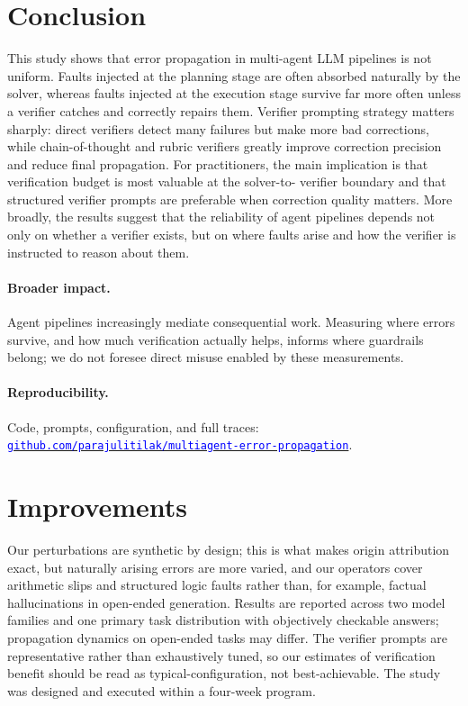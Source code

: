 \documentclass{article}
\begin{document}
\section{Conclusion}
This study shows that error propagation in multi-agent LLM pipelines is not
uniform. Faults injected at the planning stage are often absorbed naturally by
the solver, whereas faults injected at the execution stage survive far more
often unless a verifier catches and correctly repairs them. Verifier prompting
strategy matters sharply: direct verifiers detect many failures but make more
bad corrections, while chain-of-thought and rubric verifiers greatly improve
correction precision and reduce final propagation. For practitioners, the main
implication is that verification budget is most valuable at the solver-to-
verifier boundary and that structured verifier prompts are preferable when
correction quality matters. More broadly, the results suggest that the
reliability of agent pipelines depends not only on whether a verifier exists,
but on where faults arise and how the verifier is instructed to reason about
them.

\paragraph{Broader impact.} Agent pipelines increasingly mediate consequential
work. Measuring where errors survive, and how much verification actually
helps, informs where guardrails belong; we do not foresee direct misuse
enabled by these measurements.

\paragraph{Reproducibility.} Code, prompts, configuration, and full traces: \newline
\href{https://github.com/parajulitilak/multiagent-error-propagation}{\textcolor{blue}{\texttt{github.com/parajulitilak/multiagent-error-propagation}}}.

\section{Improvements}
Our perturbations are synthetic by design; this is what makes origin
attribution exact, but naturally arising errors are more varied, and our
operators cover arithmetic slips and structured logic faults rather than,
for example, factual hallucinations in open-ended generation. Results are
reported across two model families and one primary task distribution with
objectively checkable answers; propagation dynamics on open-ended tasks may
differ. The verifier prompts are representative rather than exhaustively
tuned, so our estimates of verification benefit should be read as
typical-configuration, not best-achievable. The study was designed and
executed within a four-week program.
\end{document}
